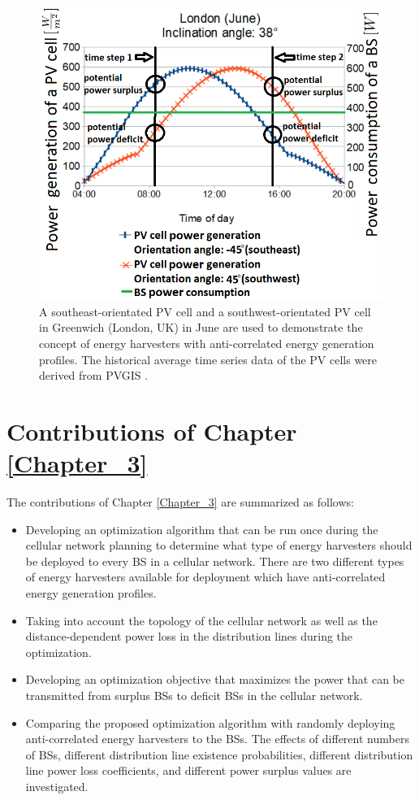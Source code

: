 \begin{figure}[H]
\centering
\includegraphics[width=0.9\columnwidth]{pictures/3}
\caption[Demonstration of the concept of energy harvesters with anti-correlated energy generation profiles]{A southeast-orientated PV cell and a southwest-orientated PV cell in Greenwich (London, UK) in June are used to demonstrate the concept of energy harvesters with anti-correlated energy generation profiles. The historical average time series data of the PV cells were derived from PVGIS \cite{PVGIS}.\label{example}}
\end{figure}


\section{Contributions of Chapter \ref{Chapter_3}}
The contributions of Chapter \ref{Chapter_3} are summarized as follows:

\begin{itemize}
\item  Developing an optimization algorithm that can be run once during the cellular network planning to determine what type of energy harvesters should be deployed to every BS in a cellular network. There are two different types of energy harvesters available for deployment which have anti-correlated energy generation profiles.
\item Taking into account the topology of the cellular network as well as the distance-dependent power loss in the distribution lines during the optimization.
\item Developing an optimization objective that maximizes the power that can be transmitted from surplus BSs to deficit BSs in the cellular network.
\item Comparing the proposed optimization algorithm with randomly deploying anti-correlated energy harvesters to the BSs. The effects of different numbers of BSs, different distribution line existence probabilities, different distribution line power loss coefficients, and different power surplus values are investigated. 
\end{itemize}

